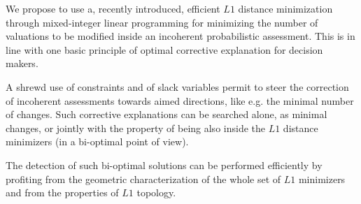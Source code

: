 
We propose to use a, recently introduced,  efficient $L1$ distance minimization through mixed-integer
linear programming for minimizing the number of valuations to be modified inside an incoherent probabilistic assessment. This is in line with one basic principle of optimal corrective explanation for decision makers.

 A shrewd use of constraints and of slack variables permit to steer the correction of incoherent assessments towards aimed directions, like e.g. the minimal number of changes. Such corrective explanations can be searched alone, as minimal changes, or jointly with the property of being also inside the $L1$ distance minimizers (in a bi-optimal point of view).
 
 The detection of such bi-optimal solutions can be performed efficiently by profiting from the geometric characterization of the whole set of $L1$ minimizers and from the properties of $L1$ topology.
 


